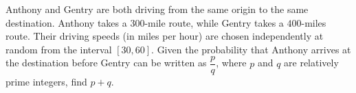 Anthony and Gentry are both driving from the same origin to the same destination. Anthony takes a $300$-mile route, while Gentry takes a $400$-miles route. Their driving speeds (in miles per hour) are chosen independently at random from the interval $[30,60]$. Given the probability that Anthony arrives at the destination before Gentry can be written as $\dfrac{p}{q}$, where $p$ and $q$ are relatively prime integers, find $p+q$.

